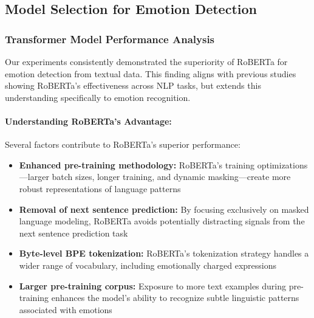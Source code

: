 \documentclass[12pt]{article}
\begin{document}
\subsection{Model Selection for Emotion Detection}
\subsubsection{Transformer Model Performance Analysis}
Our experiments consistently demonstrated the superiority of RoBERTa for emotion detection from textual data. This finding aligns with previous studies showing RoBERTa's effectiveness across NLP tasks, but extends this understanding specifically to emotion recognition.

\paragraph{Understanding RoBERTa's Advantage:}
Several factors contribute to RoBERTa's superior performance:
\begin{itemize}
    \item \textbf{Enhanced pre-training methodology:} RoBERTa's training optimizations—larger batch sizes, longer training, and dynamic masking—create more robust representations of language patterns
    
    \item \textbf{Removal of next sentence prediction:} By focusing exclusively on masked language modeling, RoBERTa avoids potentially distracting signals from the next sentence prediction task
    
    \item \textbf{Byte-level BPE tokenization:} RoBERTa's tokenization strategy handles a wider range of vocabulary, including emotionally charged expressions
    
    \item \textbf{Larger pre-training corpus:} Exposure to more text examples during pre-training enhances the model's ability to recognize subtle linguistic patterns associated with emotions
\end{itemize}
\end{document}
